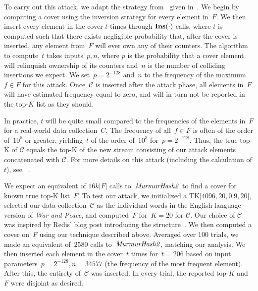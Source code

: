 To carry out this attack, we adapt the strategy from~\cite{markelon23} given in~. We begin by computing a cover using the inversion strategy for every element in~$F$. We then insert every element in the cover $t$ times through $\textbf{Ins}(\cdot)$ calls, where 
$t$ is computed such that there exists negligible probability that, after the cover is inserted, any element from~$F$ will ever own any of their counters. The algorithm to compute~$t$ takes inputs~$p,n$, where $p$ is the probability that a cover element will relinquish ownership of its counters and~$n$ is the number of colliding insertions we expect. We set~$p=2^{-128}$ and~$n$ to the frequency of the maximum~$f \in F$ for this attack. Once~$\mathcal{C}$ is inserted after the attack phase, all elements in~$F$ will have estimated frequency equal to zero, and will in turn not be reported in the top-$K$ list as they should.

In practice, $t$ will be quite small compared to the frequencies of the elements in~$F$ for a real-world data collection~$C$. The frequency of all~$f \in F$ is often of the order of~$10^5$ or greater, yielding~$t$ of the order of~$10^3$ for~$p=2^{-128}$.  Thus, the true top-K of $\mathcal{C}$ equals the top-K of the new stream consisting of our attack elements concatenated with $\mathcal{C}$. For more details on this attack (including the calculation of $t$), see ~.

We expect an equivalent of $16k|F|$ calls to~$\mathit{MurmurHash2}$ to find a cover for known true top-K list~$F$. To test our attack, we initialized a TK[$4096, 20, 0.9, 20$], selected our data collection~$\mathcal{C}$ as the individual words in the English language version of \emph{War and Peace}, and computed~$F$ for~$K{=}20$ for $\mathcal{C}$. Our choice of $\mathcal{C}$ was inspired by Redis' blog post introducing the structure~\cite{redisblogtopK}. 
We then computed a cover on~$F$ using our technique described above. Averaged over 100 trials, we made an equivalent of~$2580$ calls to~$\mathit{MurmurHash2}$, matching our analysis. We then inserted each element in the cover~$t$ times for~$t{=}206$ based on input parameters~$p{=}2^{-128}, n{=}34577$ (the frequency of the most frequent element). After this, the entirety of~$\mathcal{C}$ was inserted. In every trial, the reported top-$K$ and $F$ were disjoint as desired. 

